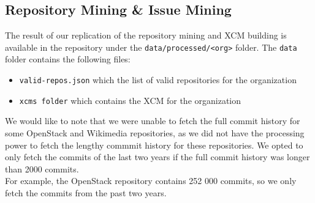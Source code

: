 \subsection{Repository Mining \& Issue Mining}
The result of our replication of the repository mining and XCM building is available in the repository under the \texttt{data/processed/<org>} folder. The \texttt{data} folder contains the following files:

\begin{itemize}
    \item \texttt{valid-repos.json} which the list of valid repositories for the organization
    \item \texttt{xcms folder} which contains the XCM for the organization
\end{itemize}

We would like to note that we were unable to fetch the full commit history for some OpenStack and Wikimedia repositories, as we did not have the processing power to fetch the lengthy commmit history for these repositories. We opted to only fetch the commits of the last two years if the full commit history was longer than 2000 commits. \\
For example, the OpenStack repository contains 252 000 commits, so we only fetch the commits from the past two years.


